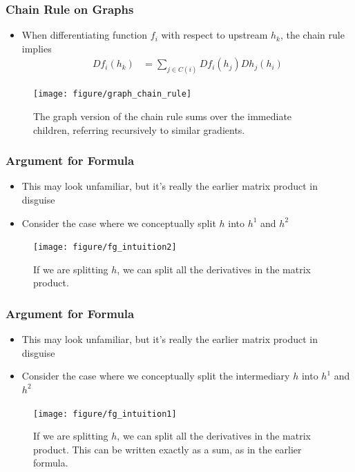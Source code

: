 \documentclass[10pt,mathserif]{beamer}
\begin{document}
\begin{frame}
  \frametitle{Chain Rule on Graphs}
  \begin{itemize}
  \item When differentiating function $f_i$ with respect to upstream $h_k$, the
    chain rule implies
    \begin{align*}
      Df_{i}\left(h_k\right) &= \sum_{j \in C\left(i\right)}
      Df_{i}\left(h_{j}\right)Dh_{j}\left(h_{i}\right)
    \end{align*}
  \end{itemize}
  \begin{figure}[ht]
    \centering
    \texttt{[image: figure/graph\_chain\_rule]}
    \caption{The graph version of the chain rule sums over the immediate
      children, referring recursively to similar gradients.
       \label{fig:flow_graph} }
  \end{figure}
\end{frame}

\begin{frame}
  \frametitle{Argument for Formula}
  \begin{itemize}
  \item This may look unfamiliar, but it's really the earlier matrix product in
    disguise
  \item Consider the case where we conceptually split $h$ into $h^{1}$ and
    $h^{2}$
  \end{itemize}
  \begin{figure}[ht]
    \centering
    \texttt{[image: figure/fg\_intuition2]}
    \caption{If we are splitting $h$, we can split all the derivatives in the
      matrix product. \label{fig:fg_intuition1} }
  \end{figure}
\end{frame}

\begin{frame}
  \frametitle{Argument for Formula}
  \begin{itemize}
  \item This may look unfamiliar, but it's really the earlier matrix product in
    disguise
  \item Consider the case where we conceptually split the intermediary $h$ into
    $h^{1}$ and $h^{2}$
  \end{itemize}
  \begin{figure}[ht]
    \centering
    \texttt{[image: figure/fg\_intuition1]}
    \caption{If we are splitting $h$, we can split all the derivatives in the
      matrix product. This can be written exactly as a sum, as in the earlier
      formula. \label{fig:fg_intuition1} }
  \end{figure}
\end{frame}
\end{document}

